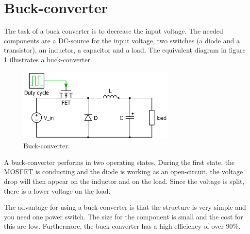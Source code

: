 \section{Buck-converter\label{Buck-C}}

The task of a buck converter is to decrease the input voltage. The needed components are a DC-source for the input voltage, two switches (a diode and a transistor), an inductor, a capacitor and a load. The equivalent diagram in figure \ref{Buck-converter} illustrates a buck-converter. %

\begin{figure}[htbp]
	\begin{center}
		\includegraphics[width=0.7\textwidth]{../Pictures/Buck-converter}
		\caption{Buck-converter.}
		\label{Buck-converter}
	\end{center}	
\end{figure}

A buck-converter performs in two operating states. 
During the first state, the MOSFET is conducting and the diode is working as an open-circuit, the voltage drop will then appear on the inductor and on the load. Since the voltage is split, there is a lower voltage on the load.

The advantage for using a buck converter is that the structure is very simple and you need one power switch. The size for the component is small and the cost for this are low. Furthermore, the buck converter has a high efficiency of over 90\%.%


